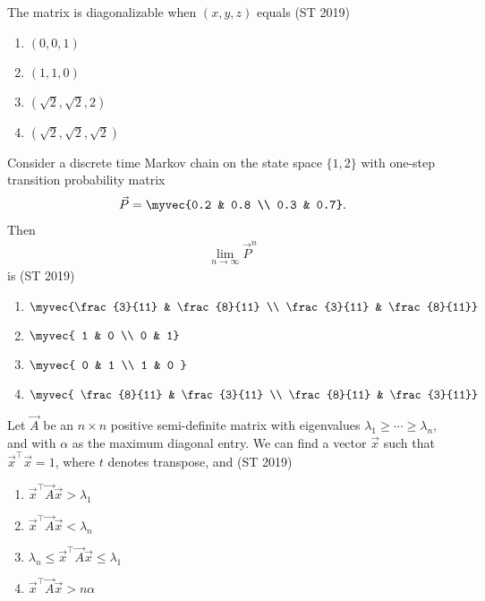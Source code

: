 \item The matrix
is diagonalizable when \((x,y,z)\) equals \hfill(ST 2019)
\begin{multicols}{4}
\begin{enumerate}
\item \((0,0,1)\)
\item \((1,1,0)\)
\item \((\sqrt{2}, \sqrt{2}, 2)\)
\item \((\sqrt{2}, \sqrt{2}, \sqrt{2})\)
\end{enumerate}
\end{multicols}
\item Consider a discrete time Markov chain on the state space \(\{1, 2\}\) with one-step transition probability matrix
\begin{align*}
\vec{P} = \myvec{0.2 & 0.8 \\
0.3 & 0.7}.
\end{align*}
Then
\begin{align*}
\lim_{n \to \infty} \vec{P}^n
\end{align*} is \hfill(ST 2019)
\begin{multicols}{4}
\begin{enumerate}
\item \(\myvec{\frac{3}{11} & \frac{8}{11} \\ \frac{3}{11} & \frac{8}{11}}\)
\item \(\myvec{ 1 & 0 \\ 0 & 1}\)
\item \(\myvec{ 0 & 1 \\ 1 & 0 }\)
\item \(\myvec{ \frac{8}{11} & \frac{3}{11} \\ \frac{8}{11} & \frac{3}{11}}\)
\end{enumerate}
\end{multicols}
\item Let \(\vec{A}\) be an \(n \times n\) positive semi-definite matrix with eigenvalues \(\lambda_1 \geq \cdots \geq \lambda_n\), and with \(\alpha\) as the maximum diagonal entry. We can find a vector \(\vec{x}\) such that \(\vec{x}^{\top} \vec{x} = 1\), where \(t\) denotes transpose, and \hfill(ST 2019)
\begin{enumerate}
\item \(\vec{x}^{\top} \vec{A} \vec{x} > \lambda_1\)
\item \(\vec{x}^{\top} \vec{A} \vec{x} < \lambda_n\)
\item \(\lambda_n \leq \vec{x}^{\top} \vec{A} \vec{x} \leq \lambda_1\)
\item \(\vec{x}^{\top} \vec{A} \vec{x} > n \alpha\)
\end{enumerate}
